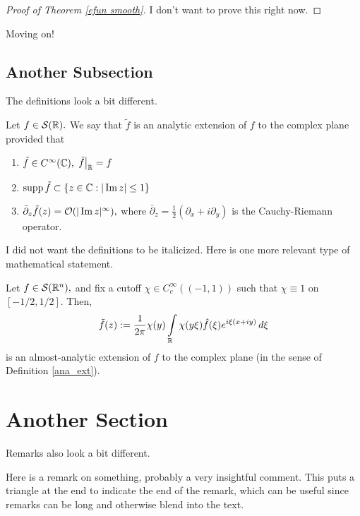 \documentclass{amsart}
\numberwithin{equation}{section}
\numberwithin{figure}{section}
\begin{document}
\begin{proof}[Proof of Theorem \ref{efun smooth}]
I don't want to prove this right now.
\end{proof}

Moving on!

\subsection{Another Subsection}

The definitions look a bit different.

\begin{definition}\label{ana_ext}
Let $f\in \mathcal{S}(\mathbb{R}).$  We say that $\tilde{f}$ is an analytic extension of $f$ to the complex plane provided that
\begin{enumerate}
\item $\tilde{f}\in C^\infty(\mathbb{C}),$ $\tilde{f}\big|_{\mathbb{R}}=f$ \item $\operatorname{supp}\tilde{f}\subset \{z\in\mathbb{C}: |\operatorname{Im} z|\leq 1\}$
\item $\bar{\partial}_z\tilde{f}(z)=\mathcal{O}(|\operatorname{Im} z|^\infty),$ where $\displaystyle{\bar{\partial}_z=\frac{1}{2}(\partial_x+i\partial_y)}$ is the Cauchy-Riemann operator.
\end{enumerate}
\end{definition}

I did not want the definitions to be italicized. Here is one more relevant type of mathematical statement.

\begin{prop}
Let $f\in\mathcal{S}(\mathbb{R}^n),$ and fix a cutoff $\chi\in C_c^\infty((-1,1))$ such that $\chi\equiv 1$ on $[-1/2,1/2].$  Then, $$\tilde{f}(z):=\frac{1}{2\pi}\chi(y)\int\limits_{\mathbb{R}}\chi(y\xi)\hat{f}(\xi)e^{i\xi(x+iy)}\, d\xi$$ is an almost-analytic extension of $f$ to the complex plane (in the sense of Definition \ref{ana_ext}).  
\end{prop}

\section{Another Section}

Remarks also look a bit different.

\begin{remark}
Here is a remark on something, probably a very insightful comment. This puts a triangle at the end to indicate the end of the remark, which can be useful since remarks can be long and otherwise blend into the text.
\end{remark}
\end{document}
